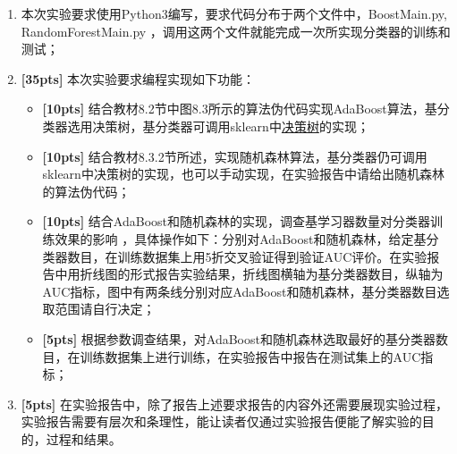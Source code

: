 \documentclass[a4paper,UTF8]{article}
\theoremstyle{definition}
\begin{document}
\begin{enumerate}[(1)]
	\item 本次实验要求使用Python3编写，要求代码分布于两个文件中，BoostMain.py, RandomForestMain.py ，调用这两个文件就能完成一次所实现分类器的训练和测试；
	
	\item \textbf{[35pts]} 本次实验要求编程实现如下功能：
	
	\begin{itemize}
		\item \textbf{[10pts]} 结合教材8.2节中图8.3所示的算法伪代码实现AdaBoost算法，基分类器选用决策树，基分类器可调用sklearn中\href{http://scikit-learn.org/stable/modules/generated/sklearn.tree.DecisionTreeClassifier.html}{决策树}的实现；
		\item \textbf{[10pts]} 结合教材8.3.2节所述，实现随机森林算法，基分类器仍可调用sklearn中决策树的实现，也可以手动实现，在实验报告中请给出随机森林的算法伪代码；
		\item \textbf{[10pts]} 结合AdaBoost和随机森林的实现，调查基学习器数量对分类器训练效果的影响 ，具体操作如下：分别对AdaBoost和随机森林，给定基分类器数目，在训练数据集上用5折交叉验证得到验证AUC评价。在实验报告中用折线图的形式报告实验结果，折线图横轴为基分类器数目，纵轴为AUC指标，图中有两条线分别对应AdaBoost和随机森林，基分类器数目选取范围请自行决定；
		\item \textbf{[5pts]} 根据参数调查结果，对AdaBoost和随机森林选取最好的基分类器数目，在训练数据集上进行训练，在实验报告中报告在测试集上的AUC指标；
	\end{itemize}
	
	\item \textbf{[5pts]} 在实验报告中，除了报告上述要求报告的内容外还需要展现实验过程，实验报告需要有层次和条理性，能让读者仅通过实验报告便能了解实验的目的，过程和结果。
	
\end{enumerate}

\end{document}
